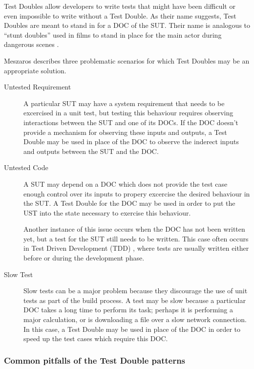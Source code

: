 Test Doubles allow developers to write tests that might have been
difficult or even impossible to write without a Test Double. As their
name suggests, Test Doubles are meant to stand in for a DOC of the
SUT. Their name is analogous to ``stunt doubles'' used in films to
stand in place for the main actor during dangerous scenes
\cite{meszaros:xunit}.

Meszaros describes three problematic scenarios for which Test Doubles
may be an appropriate solution.

\begin{description}

\item [Untested Requirement] A particular SUT may have a system
  requirement that needs to be excercised in a unit test, but testing
  this behaviour requires observing interactions between the SUT and
  one of its DOCs. If the DOC doesn't provide a mechanism for
  observing these inputs and outputs, a Test Double may be used in
  place of the DOC to observe the inderect inputs and outputs between
  the SUT and the DOC.

\item [Untested Code] A SUT may depend on a DOC which does not provide
  the test case enough control over its inputs to propery excercise
  the desired behaviour in the SUT. A Test Double for the DOC may be
  used in order to put the UST into the state necessary to exercise
  this behaviour.

  Another instance of this issue occurs when the DOC has not been
  written yet, but a test for the SUT still needs to be written. This
  case often occurs in Test Driven Development (TDD) \cite{beck:tdd},
  where tests are usually written either before or during the
  development phase.

\item [Slow Test] Slow tests can be a major problem because they
  discourage the use of unit tests as part of the build process. A
  test may be slow because a particular DOC takes a long time to
  perform its task; perhaps it is performing a major calculation, or
  is downloading a file over a slow network connection. In this case,
  a Test Double may be used in place of the DOC in order to speed up
  the test cases which require this DOC.

\end{description}

\subsubsection{Common pitfalls of the Test Double patterns}

